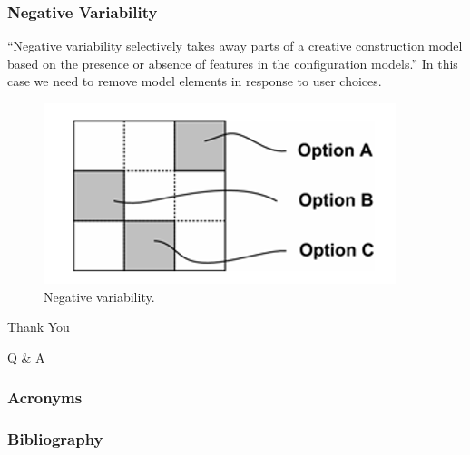 \documentclass{beamer}
\begin{document}
\begin{frame}
\frametitle{Negative Variability}

\enquote{Negative variability selectively takes away parts of a
  creative construction model based on the presence or absence of
  features in the configuration models.}\cite{groher2007expressing} In
this case we need to remove model elements in response to user
choices.

\pause{}

\begin{figure}
  \centering
  \includegraphics[scale=0.5]{images/negative_variability_voelter.png}
  \caption{Negative variability.\cite{groher2007expressing}}
\end{figure}

\end{frame}

\begin{frame}

\begin{center}
  \huge{Thank You}
\end{center}

\end{frame}

\begin{frame}

\begin{center}
    \huge{Q \& A}
\end{center}

\end{frame}

\begin{frame}
\frametitle{Acronyms}

\begin{acronym}
\end{acronym}

\end{frame}

\begin{frame}
\frametitle{Bibliography}

\printbibliography{}

\end{frame}
\end{document}
